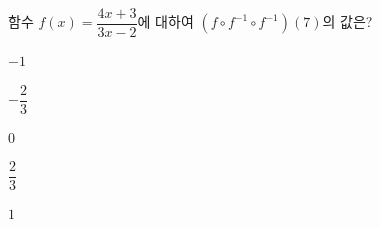 \hspace*{2mm}\begin{minipage}[t]{\dimexpr\linewidth-2mm\relax}\vspace{0pt}
함수 $f(x)=\dfrac{4x+3}{3x-2}$에 대하여 $(f\circ f^{-1}\circ f^{-1})(7)$의 값은?
\begin{choices32}{\rule[-3ex]{0pt}{8ex}$-1$}{\rule[-3ex]{0pt}{8ex}$-\dfrac{2}{3}$}{\rule[-3ex]{0pt}{8ex}$0$}{\rule[-3ex]{0pt}{8ex}$\dfrac{2}{3}$}{\rule[-3ex]{0pt}{8ex}$1$}\end{choices32}\end{minipage}
